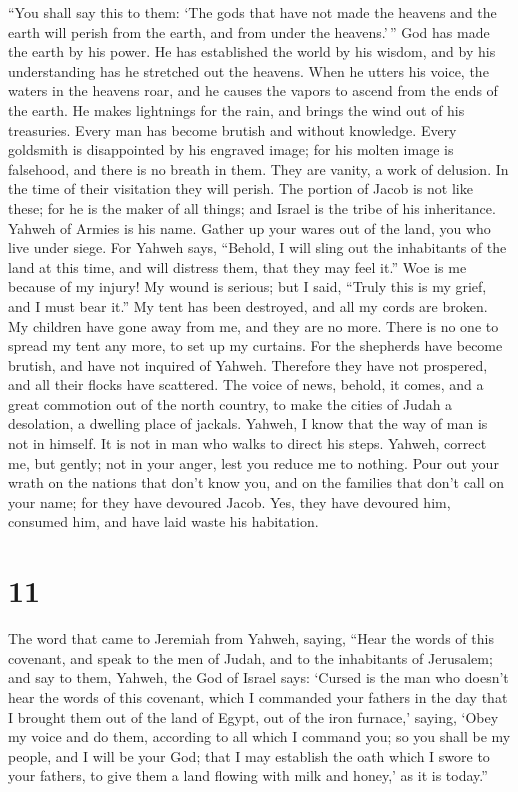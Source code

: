  ``You shall say this to them: `The gods that have not made
the heavens and the earth will perish from the earth, and from under the
heavens.'\,''  God has made the earth by his power. He has
established the world by his wisdom, and by his understanding has he
stretched out the heavens.  When he utters his voice, the
waters in the heavens roar, and he causes the vapors to ascend from the
ends of the earth. He makes lightnings for the rain, and brings the wind
out of his treasuries.  Every man has become brutish and
without knowledge. Every goldsmith is disappointed by his engraved
image; for his molten image is falsehood, and there is no breath in
them.  They are vanity, a work of delusion. In the time of
their visitation they will perish.  The portion of Jacob is
not like these; for he is the maker of all things; and Israel is the
tribe of his inheritance. Yahweh of Armies is his name. 
Gather up your wares out of the land, you who live under siege.
 For Yahweh says, ``Behold, I will sling out the
inhabitants of the land at this time, and will distress them, that they
may feel it.''  Woe is me because of my injury! My wound is
serious; but I said, ``Truly this is my grief, and I must bear it.''
 My tent has been destroyed, and all my cords are broken.
My children have gone away from me, and they are no more. There is no
one to spread my tent any more, to set up my curtains.  For
the shepherds have become brutish, and have not inquired of Yahweh.
Therefore they have not prospered, and all their flocks have scattered.
 The voice of news, behold, it comes, and a great commotion
out of the north country, to make the cities of Judah a desolation, a
dwelling place of jackals.  Yahweh, I know that the way of
man is not in himself. It is not in man who walks to direct his steps.
 Yahweh, correct me, but gently; not in your anger, lest
you reduce me to nothing.  Pour out your wrath on the
nations that don't know you, and on the families that don't call on your
name; for they have devoured Jacob. Yes, they have devoured him,
consumed him, and have laid waste his habitation.

\hypertarget{section-10}{%
\section{11}\label{section-10}}

 The word that came to Jeremiah from Yahweh, saying,
 ``Hear the words of this covenant, and speak to the men of
Judah, and to the inhabitants of Jerusalem;  and say to
them, Yahweh, the God of Israel says: `Cursed is the man who doesn't
hear the words of this covenant,  which I commanded your
fathers in the day that I brought them out of the land of Egypt, out of
the iron furnace,' saying, `Obey my voice and do them, according to all
which I command you; so you shall be my people, and I will be your God;
 that I may establish the oath which I swore to your
fathers, to give them a land flowing with milk and honey,' as it is
today.''

